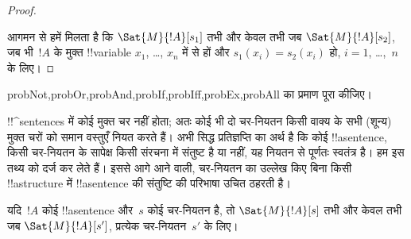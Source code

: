 \documentclass[../../../include/open-logic-section]{subfiles}
\begin{document}
\begin{proof}
\begin{enumerate}
\end{enumerate}
आगमन से हमें मिलता है कि $\Sat{M}{!A}[s_1]$ तभी और केवल तभी जब
$\Sat{M}{!A}[s_2]$, जब भी~$!A$ के मुक्त !!{variable} $x_1$, \dots,
$x_n$ में से हों और $s_1(x_i)=s_2(x_i)$ हो, $i = 1$, \dots,~$n$ के लिए।
\end{proof}

\begin{probtag}{probNot,probOr,probAnd,probIf,probIff,probEx,probAll}
 का प्रमाण पूरा कीजिए।
\end{probtag}

\begin{explain}
!!^{sentence}s में कोई मुक्त चर नहीं होता; अतः कोई भी दो चर-नियतन किसी
वाक्य के सभी (शून्य) मुक्त चरों को समान वस्तुएँ नियत करते हैं। अभी सिद्ध
प्रतिज्ञप्ति का अर्थ है कि कोई !!a{sentence}, किसी चर-नियतन के सापेक्ष किसी
संरचना में संतुष्ट है या नहीं, यह नियतन से पूर्णतः स्वतंत्र है। हम इस तथ्य
को दर्ज कर लेते हैं। इससे आगे आने वाली, चर-नियतन का उल्लेख किए बिना किसी
!!a{structure} में !!a{sentence} की संतुष्टि की परिभाषा उचित ठहरती है।
\end{explain}

\begin{cor}
यदि~$!A$ कोई !!a{sentence} और~$s$ कोई चर-नियतन है, तो
$\Sat{M}{!A}[s]$ तभी और केवल तभी जब $\Sat{M}{!A}[s']$, प्रत्येक चर-नियतन~$s'$
के लिए।
\end{cor}
\end{document}
